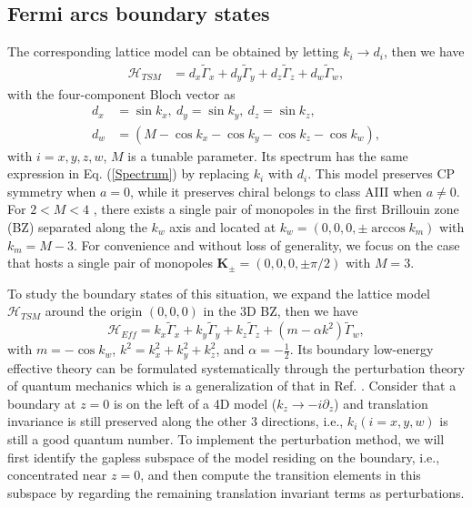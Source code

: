 \documentclass[twocolumn,prl,10pt,superscriptaddress]{revtex4}
\begin{document}
\begin{appendix}
\section{Fermi arcs boundary states}
The corresponding lattice model can be obtained by letting $k_i\rightarrow  d_i$,
 then we have
\begin{equation}
\begin{aligned}\label{HamMM}
\mathcal{H}_{TSM}&=d_x\tilde{\Gamma}_x+d_y\tilde{\Gamma}_y+ d_z\tilde{\Gamma}_z+d_w\tilde{\Gamma}_w,
\end{aligned}
\end{equation}
with the four-component Bloch vector as
\begin{equation}
\begin{aligned}\label{Blochvector}
d_x&=\sin k_x,~d_y=\sin k_y,~d_z=\sin k_z,\\
d_w&=(M-\cos k_x-\cos k_y-\cos k_z-\cos k_w),
\end{aligned}
\end{equation}
with $i=x,y,z,w$, $M$ is a tunable parameter. Its spectrum has the same expression in Eq. (\ref{Spectrum}) by replacing $k_i$ with $d_i$. This model preserves CP symmetry when $a=0$, while it preserves chiral belongs to class AIII when $a\neq 0$.   For $2<M <4$ , there exists a single
pair of monopoles in the first Brillouin zone (BZ) separated along the $k_w$ axis and located at $k_w =(0, 0, 0,\pm \arccos k_m)$ with $k_m=M-3$. For convenience
and without loss of generality, we focus on the case that hosts a single pair of monopoles ${\boldsymbol K}_{\pm}=(0,0,0,\pm \pi/2)$ with $M=3$.

To study the boundary states of this situation, we expand the lattice model $\mathcal{H}_{TSM}$ around the origin $(0,0,0)$ in the 3D BZ, then we have
\begin{equation}\label{ContinM}
\mathcal{H}_{Eff}=k_x\tilde{\Gamma}_x+k_y\tilde{\Gamma}_y+k_z\tilde{\Gamma}_z+(m-\alpha k^2)\tilde{\Gamma}_w,
\end{equation}
with $m=-\cos k_w$, $k^2={k_x^2+k_y^2+k_z^2}$,  and $\alpha=-\frac{1}{2}$.
Its boundary low-energy effective theory can be formulated systematically through the perturbation theory of quantum mechanics which is a generalization of that in Ref. \cite{SQShen,YXZhao2014}. Consider that a boundary at $z=0$ is on the left of a 4D model ($k_z\rightarrow -i\partial_z$) and translation invariance is still preserved along the
other 3 directions, i.e., $k_i (i=x,y,w)$ is still a good quantum number. To implement the perturbation method,
we will first identify the gapless subspace of the model  residing
on the boundary, i.e., concentrated near $z=0$, and then
compute the transition elements in this subspace by regarding
the remaining translation invariant terms as perturbations.


\end{appendix}
\end{document}
